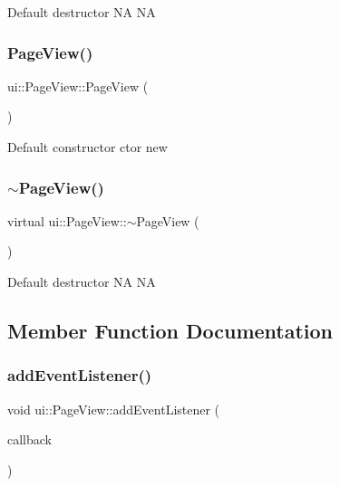 Default destructor  NA  NA \mbox{\label{classui_1_1PageView_a5b0ef1346c9a4c504162111bd668a826}} 
\subsubsection{\texorpdfstring{Page\+View()}{PageView()}\hspace{0.1cm}{\footnotesize\ttfamily [2/2]}}
{\footnotesize\ttfamily ui\+::\+Page\+View\+::\+Page\+View (\begin{DoxyParamCaption}{ }\end{DoxyParamCaption})}

Default constructor  ctor  new \mbox{\label{classui_1_1PageView_a7a6747406aba5a13a3240807317f8bae}} 
\subsubsection{\texorpdfstring{$\sim$\+Page\+View()}{~PageView()}\hspace{0.1cm}{\footnotesize\ttfamily [2/2]}}
{\footnotesize\ttfamily virtual ui\+::\+Page\+View\+::$\sim$\+Page\+View (\begin{DoxyParamCaption}{ }\end{DoxyParamCaption})\hspace{0.3cm}{\ttfamily [virtual]}}

Default destructor  NA  NA 

\subsection{Member Function Documentation}
\mbox{\label{classui_1_1PageView_a8887593dc71c203af06f8043082d2de4}} 
\subsubsection{\texorpdfstring{add\+Event\+Listener()}{addEventListener()}\hspace{0.1cm}{\footnotesize\ttfamily [1/2]}}
{\footnotesize\ttfamily void ui\+::\+Page\+View\+::add\+Event\+Listener (\begin{DoxyParamCaption}\item[{const \hyperlink{classui_1_1PageView_a1cbaf2e41005380574beae96ac2bc136}{cc\+Page\+View\+Callback} \&}]{callback }\end{DoxyParamCaption})\hspace{0.3cm}{\ttfamily [virtual]}}




